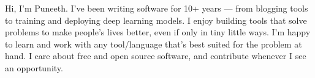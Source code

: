 
\begin{cvparagraph}
Hi, I'm Puneeth. I've been writing software for 10+ years --- from blogging tools to training and deploying deep learning models. I enjoy building tools that solve problems to make people's lives better, even if only in tiny little ways. I'm happy to learn and work with any tool/language that's best suited for the problem at hand. I care about free and open source software, and contribute whenever I see an opportunity.
\end{cvparagraph}
